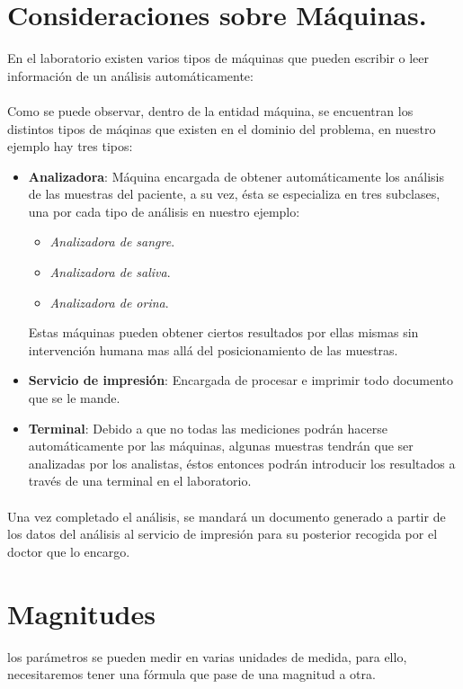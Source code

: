 \documentclass[a4paper,10pt]{article}
\begin{document}
\pagebreak
\section{Consideraciones sobre Máquinas.}
En el laboratorio existen varios tipos de máquinas que pueden escribir o leer información de un análisis automáticamente:
\paragraph{}
Como se puede observar, dentro de la entidad máquina, se encuentran los distintos tipos de máqinas que existen en el dominio del problema, en nuestro ejemplo hay tres tipos:
\begin{itemize}
\item {\bf Analizadora}: Máquina encargada de obtener automáticamente los análisis de las muestras del paciente, a su vez, ésta se especializa en tres subclases, una por cada tipo de análisis en nuestro ejemplo:
\begin{itemize}
\item {\it Analizadora de sangre}.
\item {\it Analizadora de saliva}.
\item {\it Analizadora de orina}.
\end{itemize}
Estas máquinas pueden obtener ciertos resultados por ellas mismas sin intervención humana mas allá del posicionamiento de las muestras.
\item {\bf Servicio de impresión}: Encargada de procesar e imprimir todo documento que se le mande.
\item {\bf Terminal}: Debido a que no todas las mediciones podrán hacerse automáticamente por las máquinas, algunas muestras tendrán que ser analizadas por los analistas, éstos entonces podrán introducir los resultados a través de una terminal en el laboratorio.
\end{itemize}

\paragraph{}
Una vez completado el análisis, se mandará un documento generado a partir de los datos del análisis al servicio de impresión para su posterior recogida por el doctor que lo encargo.

\pagebreak

\section{Magnitudes}
los parámetros se pueden medir en varias unidades de medida, para ello, necesitaremos tener una fórmula que pase de una magnitud a otra.
\end{document}
